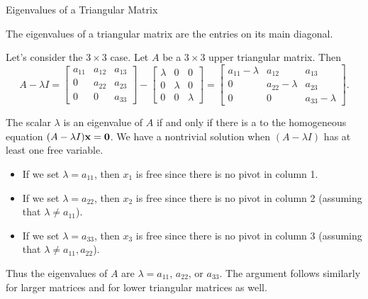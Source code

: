 \documentclass[xcolor=dvipsnames,aspectratio=169,t]{beamer}
\begin{document}
\begin{frame}{Eigenvalues of a Triangular Matrix}
  \begin{theorem}
  The eigenvalues of a \alert{triangular matrix} are the entries on its main diagonal.
  \end{theorem}
  \medskip

  \pause
  {\small
  Let's consider the \alert{$3 \times 3$} case. Let $A$ be a $3 \times 3$ upper triangular matrix. Then
  \[ A - \lambda I = \begin{bmatrix} a_{11} & a_{12} & a_{13} \\ 0 & a_{22} & a_{23} \\ 0 & 0 & a_{33} \end{bmatrix} -
  \begin{bmatrix} \lambda & 0 & 0 \\ 0 & \lambda & 0 \\ 0 & 0 & \lambda \end{bmatrix} =
  \begin{bmatrix} a_{11}-\lambda & a_{12} & a_{13} \\ 0 & a_{22}-\lambda & a_{23} \\ 0 & 0 & a_{33}-\lambda \end{bmatrix}. \]

  The scalar $\lambda$ is an eigenvalue of $A$ if and only if there is a  to the homogeneous equation $(A - \lambda I) \mathbf{x} = \mathbf{0}$.
  We have a nontrivial solution when $(A - \lambda I)$ has at least one \alert{free variable}.
  \pause
  \begin{itemize}
    \item If we set $\lambda=a_{11}$, then $x_1$ is free since there is no pivot in column 1.
    \item If we set $\lambda=a_{22}$, then $x_2$ is free since there is no pivot in column 2 (assuming that $\lambda\ne a_{11}$).
    \item If we set $\lambda=a_{33}$, then $x_3$ is free since there is no pivot in column 3 (assuming that $\lambda\ne a_{11},a_{22}$).
  \end{itemize}
  Thus the eigenvalues of $A$ are $\lambda = a_{11}$, $a_{22}$, or $a_{33}$.
  The argument follows similarly for larger matrices and for lower triangular matrices as well.
  \hfill\blue{\qed}
  } %
\end{frame}
\end{document}
